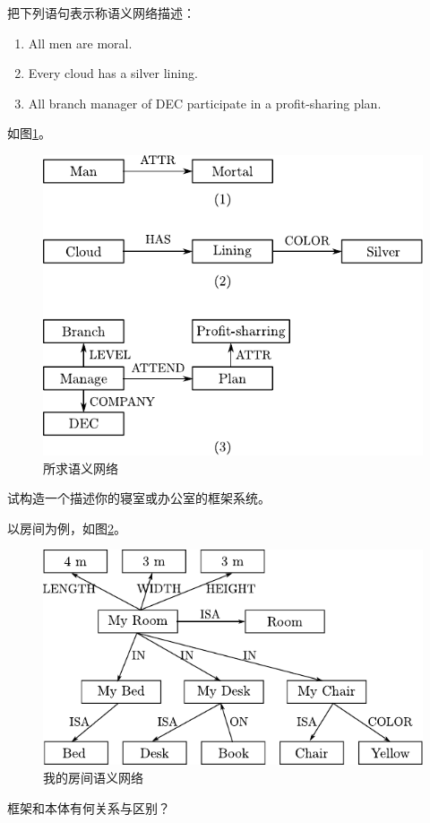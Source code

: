 \begin{question}
把下列语句表示称语义网络描述：
	\begin{enumerate}
		\item All men are moral.
		\item Every cloud has a silver lining.
		\item All branch manager of DEC participate in a profit-sharing plan. 
	\end{enumerate}
\end{question}
\begin{solution}
如图\ref{Fig:semantic-net}。
	\begin{figure}[h]
		\centering
		\includegraphics[scale=.9]{figures/ans-2.8.pdf}
		\caption{ 所求语义网络 } \label{Fig:semantic-net}
	\end{figure}
\end{solution}

\begin{question}
试构造一个描述你的寝室或办公室的框架系统。
\end{question}
\begin{solution}
以房间为例，如图\ref{Fig:semantic-my-room}。
	\begin{figure}[h]
		\centering
		\includegraphics[scale=.9]{figures/ans-2.9.pdf}
		\caption{ 我的房间语义网络 } \label{Fig:semantic-my-room}
	\end{figure}
\end{solution}

\begin{question}
框架和本体有何关系与区别？
\end{question}
\begin{solution}
\end{solution}
